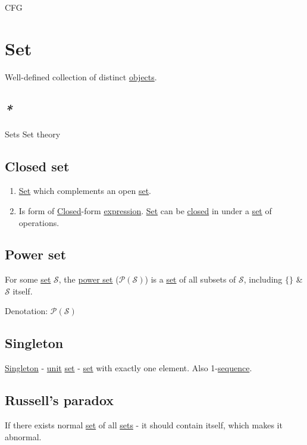 \documentclass[a4paper,14pt,oneside]{book}
\begin{document}
\label{orgf4bc053}CFG

\chapter{\label{orgb802935}Set}
\label{sec:orgc93deac}
Well-defined collection of distinct \hyperref[orgee8cdbc]{objects}.

\section{\emph{*}}
\label{sec:orgc4e0c27}

\label{org6f2e819}Sets
\label{org234bf40}Set theory

\section{\label{org925a81f}Closed set}
\label{sec:org1f749bc}
\begin{enumerate}
\item \hyperref[orgb802935]{Set} which complements an open \hyperref[orgb802935]{set}.

\item Is form of \hyperref[org0193b5e]{Closed}-form \hyperref[org25316bc]{expression}. \hyperref[orgb802935]{Set} can be \hyperref[org0193b5e]{closed} in under a \hyperref[orgb802935]{set} of operations.
\end{enumerate}

\section{\label{orgf054aeb}Power set}
\label{sec:org26868be}
For some \hyperref[orgb802935]{set} \(\mathcal{S}\), the \hyperref[orgf054aeb]{power set} (\(\mathcal{P(S)}\)) is a \hyperref[orgb802935]{set} of all subsets of \(\mathcal{S}\), including \(\{\}\) \& \(\mathcal{S}\) itself.

Denotation:
\(\mathcal{P(S)}\)

\section{\label{org1e21ea4}Singleton}
\label{sec:orgc56e51f}
\hyperref[org1e21ea4]{Singleton} - \hyperref[orgbf79620]{unit} \hyperref[orgb802935]{set} - \hyperref[orgb802935]{set} with exactly one element.
Also 1-\hyperref[orgb14804e]{sequence}.

\section{\label{org76ee276}Russell's paradox}
\label{sec:org6d4dfac}
If there exists normal \hyperref[orgb802935]{set} of all \hyperref[org6f2e819]{sets} - it should contain itself, which makes it abnormal.
\end{document}
